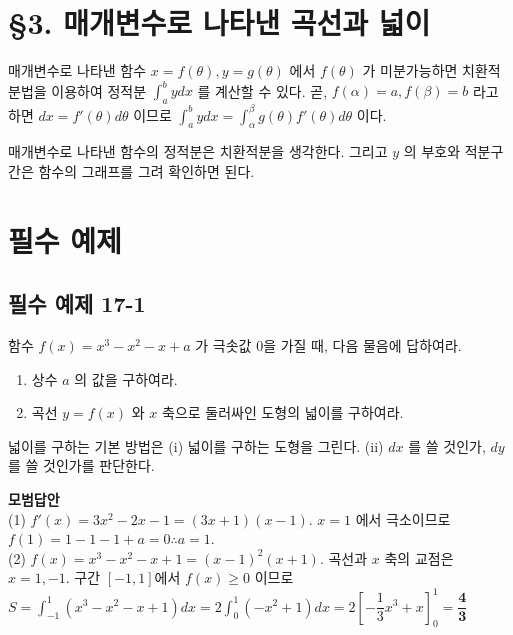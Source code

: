 \documentclass[a4paper,11pt]{article}
\begin{document}
\section*{§3. 매개변수로 나타낸 곡선과 넓이}

\begin{conceptbox}[기본 정석]
매개변수로 나타낸 함수 $x=f(\theta), y=g(\theta)$ 에서 $f(\theta)$ 가 미분가능하면 치환적분법을 이용하여 정적분 $\int_a^b y dx$ 를 계산할 수 있다. 곧, $f(\alpha)=a, f(\beta)=b$ 라고 하면 $dx = f'(\theta) d\theta$ 이므로 $\int_a^b y dx = \int_{\alpha}^{\beta} g(\theta) f'(\theta) d\theta$ 이다.
\end{conceptbox}

\begin{advicebox}
매개변수로 나타낸 함수의 정적분은 치환적분을 생각한다. 그리고 $y$ 의 부호와 적분구간은 함수의 그래프를 그려 확인하면 된다.
\end{advicebox}

\newpage

\section*{필수 예제}

\subsection*{필수 예제 17-1}
함수 $f(x)=x^3-x^2-x+a$ 가 극솟값 0을 가질 때, 다음 물음에 답하여라.
\begin{enumerate}[label=(\arabic*)]
    \item 상수 $a$ 의 값을 구하여라.
    \item 곡선 $y=f(x)$ 와 $x$ 축으로 둘러싸인 도형의 넓이를 구하여라.
\end{enumerate}

\begin{studybox}
넓이를 구하는 기본 방법은 (i) 넓이를 구하는 도형을 그린다. (ii) $dx$ 를 쓸 것인가, $dy$ 를 쓸 것인가를 판단한다.
\end{studybox}

\textbf{모범답안} \\
(1) $f'(x)=3x^2-2x-1=(3x+1)(x-1)$. $x=1$ 에서 극소이므로 $f(1)=1-1-1+a=0 \therefore a=1$. \\
(2) $f(x)=x^3-x^2-x+1=(x-1)^2(x+1)$. 곡선과 $x$ 축의 교점은 $x=1, -1$. 구간 $[-1, 1]$에서 $f(x) \ge 0$ 이므로 \\
$S = \int_{-1}^{1} (x^3-x^2-x+1) dx = 2\int_{0}^{1} (-x^2+1) dx = 2[-\dfrac{1}{3}x^3+x]_0^1 = \mathbf{\dfrac{4}{3}}$
\end{document}
